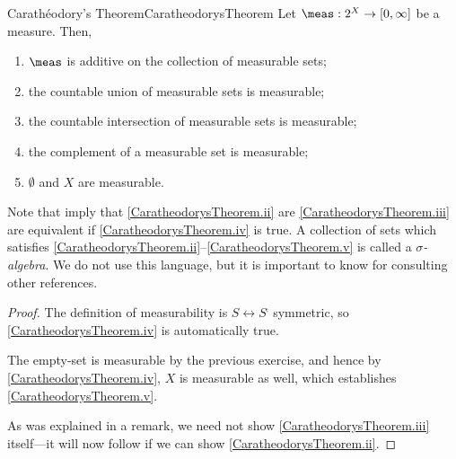\begin{thm}{Carathéodory's Theorem}{CaratheodorysTheorem}
Let $\meas :2^X\rightarrow [0,\infty ]$ be a measure.  Then,
\begin{enumerate}
\item \label{CaratheodorysTheorem.i}$\meas$ is additive on the collection of measurable sets;
\item \label{CaratheodorysTheorem.ii}the countable union of measurable sets is measurable;
\item \label{CaratheodorysTheorem.iii}the countable intersection of measurable sets is measurable;
\item \label{CaratheodorysTheorem.iv}the complement of a measurable set is measurable;
\item \label{CaratheodorysTheorem.v}$\emptyset$ and $X$ are measurable.
\end{enumerate}
\begin{rmk}
Note that  imply that \cref{CaratheodorysTheorem.ii} are \cref{CaratheodorysTheorem.iii} are equivalent if \cref{CaratheodorysTheorem.iv} is true.  A collection of sets which satisfies \cref{CaratheodorysTheorem.ii}--\cref{CaratheodorysTheorem.v} is called a \emph{$\sigma$-algebra}.  We do not use this language, but it is important to know for consulting other references.
\end{rmk}
\begin{proof}
The definition of measurability is $S\leftrightarrow S^{\comp}$ symmetric, so \cref{CaratheodorysTheorem.iv} is automatically true.

The empty-set is measurable by the previous exercise, and hence by \cref{CaratheodorysTheorem.iv}, $X$ is measurable as well, which establishes \cref{CaratheodorysTheorem.v}.

As was explained in a remark, we need not show \cref{CaratheodorysTheorem.iii} itself---it will now follow if we can show \cref{CaratheodorysTheorem.ii}.


\end{proof}
\end{thm}

